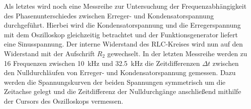 Als letztes wird noch eine Messreihe zur Untersuchung der Frequenzabhängigkeit des Phasenunterschiedes zwischen Erreger- und Kondensatorspannung durchgeführt.
Hierbei wird die Kondensatorspannung und die Erregerspannung mit dem Oszilloskop gleichzeitig betrachtet und der Funktionsgenerator liefert eine Sinusspannung. 
Der interne Widerstand des RLC-Kreises wird nun auf den Widerstand mit der Aufschrift $R_2$ gewechselt.
In der letzten Messreihe werden zu 16 Frequenzen zwischen \SI{10}{\kilo\hertz} und \SI{32.5}{\kilo\hertz} die Zeitdifferenzen $\Delta t$ zwischen den Nulldurchläufen von Erreger- und Kondensatorspannung gemessen. Dazu werden die Spannungskurven der beiden Spannungen symmetrisch um die Zeitachse gelegt und die Zeitdifferenz der Nulldurchgänge anschließend mithilfe der Cursors des Oszilloskops vermessen.